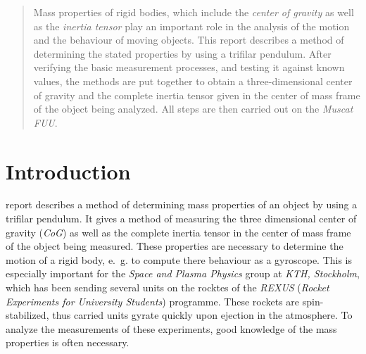 \documentclass[journal]{IEEEtran}
\begin{document}




\maketitle

\begin{abstract}
	Mass properties of rigid bodies, which include the \emph{center of gravity} as well as the \emph{inertia tensor} play an important role in the analysis of the motion and the behaviour of moving objects.
	This report describes a method of determining the stated properties by using a trifilar pendulum.
	After verifying the basic measurement processes, and testing it against known values, the methods are put together to obtain a three-dimensional center of gravity and the complete inertia tensor given in the center of mass frame of the object being analyzed.
	All steps are then carried out on the \emph{Muscat FUU}.
\end{abstract}







%
\IEEEpeerreviewmaketitle



\section{Introduction}

 report describes a method of determining mass properties of an object by using a trifilar pendulum.
It gives a method of measuring the three dimensional center of gravity (\emph{CoG}) as well as the complete inertia tensor in the center of mass frame of the object being measured.
These properties are necessary to determine the motion of a rigid body, e.~g. to compute there behaviour as a gyroscope.
This is especially important for the \emph{Space and Plasma Physics} group at \emph{KTH, Stockholm}, which has been sending several units on the rocktes of the \emph{REXUS} (\emph{Rocket Experiments for University Students}) programme. These rockets are spin-stabilized, thus carried units gyrate quickly upon ejection in the atmosphere.
To analyze the measurements of these experiments, good knowledge of the mass properties is often necessary.
\end{document}
